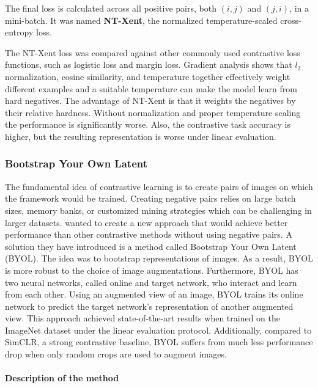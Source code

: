 \documentclass[
]{krantz}
\begin{document}
The final loss is calculated across all positive pairs, both \(\left( i,j \right)\) and \(\left( j,i \right)\), in a mini-batch. It was named \textbf{NT-Xent}, the normalized temperature-scaled cross-entropy loss.

The NT-Xent loss was compared against other commonly used contrastive loss functions, such as logistic loss and margin loss. Gradient analysis shows that \(l_2\) normalization, cosine similarity, and temperature together effectively weight different examples and a suitable temperature can make the model learn from hard negatives. The advantage of NT-Xent is that it weights the negatives by their relative hardness. Without normalization and proper temperature scaling the performance is significantly worse. Also, the contrastive task accuracy is higher, but the resulting representation is worse under linear evaluation.

\hypertarget{bootstrap-your-own-latent}{%
\subsubsection{Bootstrap Your Own Latent}\label{bootstrap-your-own-latent}}

The fundamental idea of contrastive learning is to create pairs of images on which the framework would be trained. Creating negative pairs relies on large batch sizes, memory banks, or customized mining strategies which can be challenging in larger datasets. \citet{BYOL} wanted to create a new approach that would achieve better performance than other contrastive methods without using negative pairs. A solution they have introduced is a method called Bootstrap Your Own Latent (BYOL). The idea was to bootstrap representations of images. As a result, BYOL is more robust to the choice of image augmentations.
Furthermore, BYOL has two neural networks, called online and target network, who interact and learn from each other. Using an augmented view of an image, BYOL trains its online network to predict the target network's representation of another augmented view. This approach achieved state-of-the-art results when trained on the ImageNet dataset under the linear evaluation protocol. Additionally, compared to SimCLR, a strong contrastive baseline, BYOL suffers from much less performance drop when only random crops are used to augment images.

\hypertarget{description-of-the-method}{%
\paragraph{Description of the method}\label{description-of-the-method}}
\end{document}
